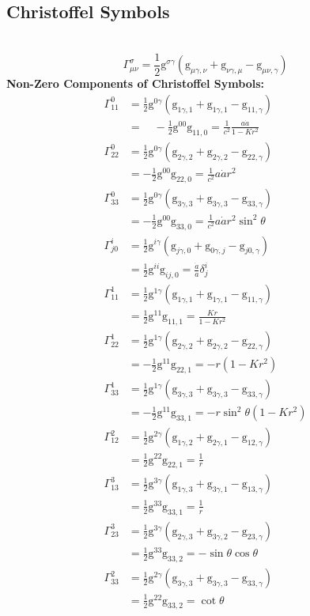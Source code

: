 \documentclass[14pt]{article}
\newcommand{\csg}[2]{\Gamma^{#1}_{#2}}
\newcommand{\g}{\mathrm{g}}
\newcommand{\csge}[3]{\frac{1}{2} \mathrm{g}^{#1\gamma}(\mathrm{g}_{#2\gamma, #3}+\mathrm{g}_{#3 \gamma,#2}-\mathrm{g}_{#2 #3,\gamma})}
\begin{document}
\subsection{Christoffel Symbols}
\quad\\

\[
\csg{\sigma}{\mu\nu}=\csge{\sigma}{\mu}{\nu}\tag{1.2.1}
\]
\textbf{Non-Zero Components of Christoffel Symbols:}
\begin{align*}
\csg{0}{11} &= \csge{0}{1}{1}\\
            &= \quad -\frac{1}{2}\g^{00}\g_{11,0}
            = \frac{1}{c^{2}}\frac{a\Dot{a}}{1-Kr^{2}}\tag{1.2.2}\\
\csg{0}{22} &= \csge{0}{2}{2}\\
            &= -\frac{1}{2}\g^{00}\g_{22,0}
            = \frac{1}{c^{2}}a\Dot{a}r^{2}\tag{1.2.3}\\
\csg{0}{33} &= \csge{0}{3}{3} \\
            &= -\frac{1}{2}\g^{00}\g_{33,0}
            = \frac{1}{c^{2}}a\Dot{a}r^{2}\sin^{2}\theta\tag{1.2.4}\\
\csg{i}{j0} &= \csge{i}{j}{0} \\
            &= \frac{1}{2}\g^{ii}\g_{ij,0}
            = \frac{\Dot{a}}{a}\delta^{i}_{j}\tag{1.2.5}\\
\csg{1}{11} &= \csge{1}{1}{1} \\
            &= \frac{1}{2}\g^{11}\g_{11,1}
            = \frac{Kr}{1-Kr^{2}}\tag{1.2.6}\\
\csg{1}{22} &= \csge{1}{2}{2} \\
            &= -\frac{1}{2}\g^{11}\g_{22,1}
            = -r(1-Kr^{2}) \tag{1.2.7}\\   
\csg{1}{33} &= \csge{1}{3}{3} \\
            &= -\frac{1}{2}\g^{11}\g_{33,1}
            = -r\sin^{2}\theta(1-Kr^{2}) \tag{1.2.8}\\  
\csg{2}{12} &=  \csge{2}{1}{2}\\
            &= \frac{1}{2}\g^{22}\g_{22,1}
            = \frac{1}{r} \tag{1.2.9}\\
\csg{3}{13} &= \csge{3}{1}{3} \\
            &= \frac{1}{2}\g^{33}\g_{33,1}
            = \frac{1}{r}  \tag{1.2.10}\\ 
\csg{3}{23} &= \csge{3}{2}{3} \\
            &= \frac{1}{2}\g^{33}\g_{33,2}
            = -\sin \theta \cos \theta  \tag{1.2.11}\\
\csg{2}{33} &= \csge{2}{3}{3} \\
            &= \frac{1}{2}\g^{22}\g_{33,2}
            = \cot \theta  \tag{1.2.12}
\end{align*}
\end{document}
